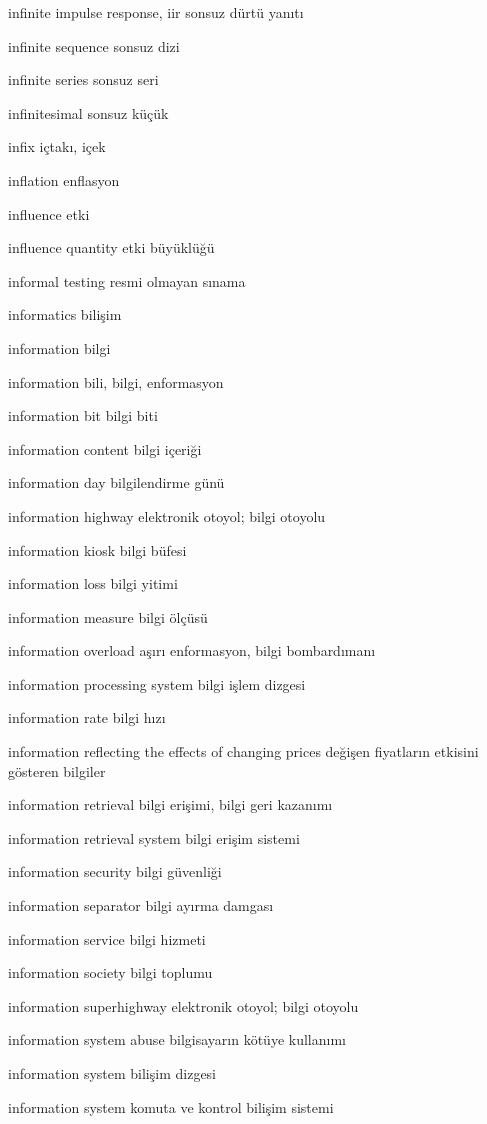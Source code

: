 \documentclass[12pt,fleqn]{article}\usepackage{../../common}
\begin{document}
infinite impulse response, iir sonsuz dürtü yanıtı

infinite sequence sonsuz dizi

infinite series sonsuz seri

infinitesimal sonsuz küçük

infix içtakı, içek

inflation enflasyon

influence etki

influence quantity etki büyüklüğü

informal testing resmi olmayan sınama

informatics bilişim

information bilgi

information bili, bilgi, enformasyon

information bit bilgi biti

information content bilgi içeriği

information day bilgilendirme günü

information highway elektronik otoyol; bilgi otoyolu

information kiosk bilgi büfesi

information loss bilgi yitimi

information measure bilgi ölçüsü

information overload aşırı enformasyon, bilgi bombardımanı

information processing system bilgi işlem dizgesi

information rate bilgi hızı

information reflecting the effects of changing prices değişen fiyatların etkisini gösteren bilgiler

information retrieval bilgi erişimi, bilgi geri kazanımı

information retrieval system bilgi erişim sistemi

information security bilgi güvenliği

information separator bilgi ayırma damgası

information service bilgi hizmeti

information society bilgi toplumu

information superhighway elektronik otoyol; bilgi otoyolu

information system abuse bilgisayarın kötüye kullanımı

information system bilişim dizgesi

information system komuta ve kontrol bilişim sistemi
\end{document}
